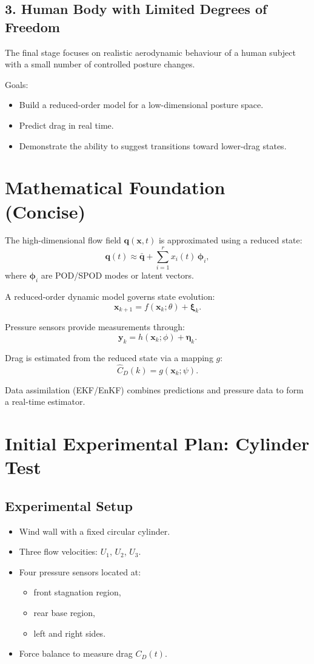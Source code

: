 \documentclass[12pt]{article}
\begin{document}
\subsection*{3. Human Body with Limited Degrees of Freedom}
The final stage focuses on realistic aerodynamic behaviour of a human subject with a small number of controlled posture changes.

Goals:
\begin{itemize}
    \item Build a reduced-order model for a low-dimensional posture space.
    \item Predict drag in real time.
    \item Demonstrate the ability to suggest transitions toward lower-drag states.
\end{itemize}

\section{Mathematical Foundation (Concise)}
The high-dimensional flow field $\mathbf{q}(\mathbf{x}, t)$ is approximated using a reduced state:
\[
  \mathbf{q}(t) \approx \bar{\mathbf{q}} + \sum_{i=1}^r x_i(t)\,\boldsymbol{\phi}_i,
\]
where $\boldsymbol{\phi}_i$ are POD/SPOD modes or latent vectors.

A reduced-order dynamic model governs state evolution:
\[
  \mathbf{x}_{k+1} = f(\mathbf{x}_k; \theta) + \boldsymbol{\xi}_k.
\]

Pressure sensors provide measurements through:
\[
  \mathbf{y}_k = h(\mathbf{x}_k; \phi) + \boldsymbol{\eta}_k.
\]

Drag is estimated from the reduced state via a mapping $g$:
\[
  \hat{C}_D(k) = g(\mathbf{x}_k; \psi).
\]

Data assimilation (EKF/EnKF) combines predictions and pressure data to form a real-time estimator.

\section{Initial Experimental Plan: Cylinder Test}
\subsection*{Experimental Setup}
\begin{itemize}
    \item Wind wall with a fixed circular cylinder.
    \item Three flow velocities: $U_1$, $U_2$, $U_3$.
    \item Four pressure sensors located at:
    \begin{itemize}
        \item front stagnation region,
        \item rear base region,
        \item left and right sides.
    \end{itemize}
    \item Force balance to measure drag $C_D(t)$.
\end{itemize}
\end{document}
